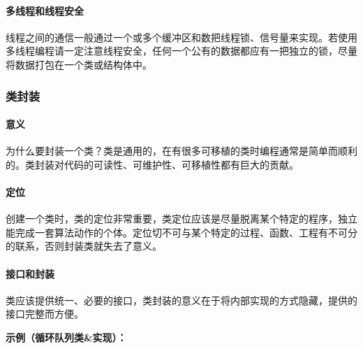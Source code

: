 \documentclass[
]{article}
\begin{document}
\hypertarget{ux591aux7ebfux7a0bux548cux7ebfux7a0bux5b89ux5168}{%
\paragraph{多线程和线程安全}\label{ux591aux7ebfux7a0bux548cux7ebfux7a0bux5b89ux5168}}

线程之间的通信一般通过一个或多个缓冲区和数把线程锁、信号量来实现。若使用多线程编程请一定注意线程安全，任何一个公有的数据都应有一把独立的锁，尽量将数据打包在一个类或结构体中。

\hypertarget{ux7c7bux5c01ux88c5}{%
\subsubsection{类封装}\label{ux7c7bux5c01ux88c5}}

\hypertarget{ux610fux4e49}{%
\paragraph{意义}\label{ux610fux4e49}}

为什么要封装一个类？类是通用的，在有很多可移植的类时编程通常是简单而顺利的。类封装对代码的可读性、可维护性、可移植性都有巨大的贡献。

\hypertarget{ux5b9aux4f4d}{%
\paragraph{定位}\label{ux5b9aux4f4d}}

创建一个类时，类的定位非常重要，类定位应该是尽量脱离某个特定的程序，独立能完成一套算法动作的个体。定位切不可与某个特定的过程、函数、工程有不可分的联系，否则封装类就失去了意义。

\hypertarget{ux63a5ux53e3ux548cux5c01ux88c5}{%
\paragraph{接口和封装}\label{ux63a5ux53e3ux548cux5c01ux88c5}}

类应该提供统一、必要的接口，类封装的意义在于将内部实现的方式隐藏，提供的接口完整而方便。

\textbf{示例（循环队列类\&实现）：}
\end{document}
